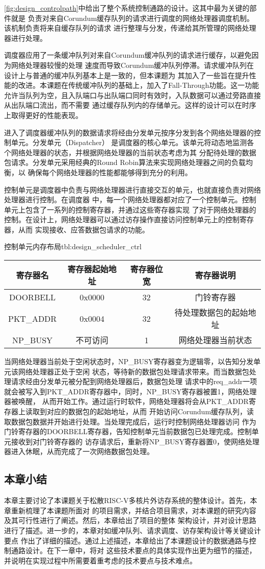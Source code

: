 \autoref{fig:design_controlpath}中给出了整个系统控制通路的设计。这其中最为关键的部件就是
负责对来自Corundum缓存队列的请求进行调度的网络处理器调度机制。该机制负责将来自缓存队列的请求
进行整理与分发，传递给其所管理的网络处理器进行处理。

调度器应用了一条缓冲队列对来自Corundum缓冲队列的请求进行缓存，以避免因为网络处理器较慢的处理
速度而导致Corundum缓冲队列停滞。请求缓冲队列在设计上与普通的缓冲队列基本上是一致的，但本课题为
其加入了一些旨在提升性能的改进。本课题在传统缓冲队列的基础上，加入了Fall-Through功能。这一功能
允许当队列为空，且入队端口与出队端口同时有效时，入队数据可以通过旁路直接从出队端口流出，而不需要
通过缓存队列内的存储单元。这样的设计可以在时序上取得更好的性能表现。

进入了调度器缓冲队列的数据请求将经由分发单元按序分发到各个网络处理器的控制单元。分发单元（Dispatcher）
是调度器的核心单元。该单元将动态地监测各个网络处理器的状态，并根据网络处理器的当前状态考虑为其
分配待处理的数据包请求。分发单元采用经典的Round Robin算法来实现网络处理器之间的负载均衡，以
确保每个网络处理器的性能都能够得到充分的利用。

控制单元是调度器中负责与网络处理器进行直接交互的单元，也就直接负责对网络处理器进行控制。在调度器
中，每一个网络处理器都对应了一个控制单元。控制单元上包含了一系列的控制寄存器，并通过这些寄存器实现
了对于网络处理器的控制。在设计上，网络处理器可以通过访存操作直接访问控制单元上的控制寄存器，从而
实现接收、应答数据包请求的功能。

\begin{generaltab}{控制单元内存布局}{tbl:design_scheduler_ctrl}
  \begin{tabular}{cccc}
    \toprule
    寄存器名 & 寄存器起始地址 & 寄存器位宽 & 寄存器说明 \\
    \midrule
    DOORBELL & 0x0000 & 32 & 门铃寄存器 \\
    PKT\_ADDR & 0x0004 & 32 & 待处理数据包的起始地址 \\
    \midrule
    NP\_BUSY & 不可访问 & 1 & 网络处理器当前状态 \\
    \bottomrule
  \end{tabular}
\end{generaltab}

当网络处理器当前处于空闲状态时，NP\_BUSY寄存器变为逻辑零，以告知分发单元该网络处理器正处于空闲
状态，等待新的数据包处理请求带来。而当数据包处理请求经由分发单元被分配到网络处理器后，数据包处理
请求中的req\_addr一项就会被写入到PKT\_ADDR寄存器中，同时，NP\_BUSY寄存器被置1，网络处理器被唤醒，
从而开始工作。通过运行时软件，网络处理器将会从PKT\_ADDR寄存器上读取到对应的数据包的起始地址，从而
开始访问Corundum缓存队列，读取数据包数据并开始进行处理。当处理完成后，运行时控制网络处理器访问
作为门铃寄存器的DOORBELL寄存器，告知控制单元当前数据包已处理完成。控制单元接收到对门铃寄存器的
访存请求后，重新将NP\_BUSY寄存器置0，使网络处理器进入休眠，从而完成了一次网络数据包处理。

\subsection{本章小结}

本章主要讨论了本课题关于松散RISC-V多核片外访存系统的整体设计。首先，本章重新梳理了本课题所面对
的项目需求，并结合项目需求，对本课题的研究内容及其可行性进行了阐述。然后，本章给出了项目的整体
架构设计，并对设计思路进行了描述。进一步的，本章对如缓冲队列、请求调度、访存架构设计等关键设计要点
作出了详细的描述。通过上述描述，本章给出了本课题设计的数据通路与控制通路设计。在下一章中，将对
这些技术要点的具体实现作出更为细节的描述，并说明在实现过程中所需要着重考虑的技术要点与技术难点。

